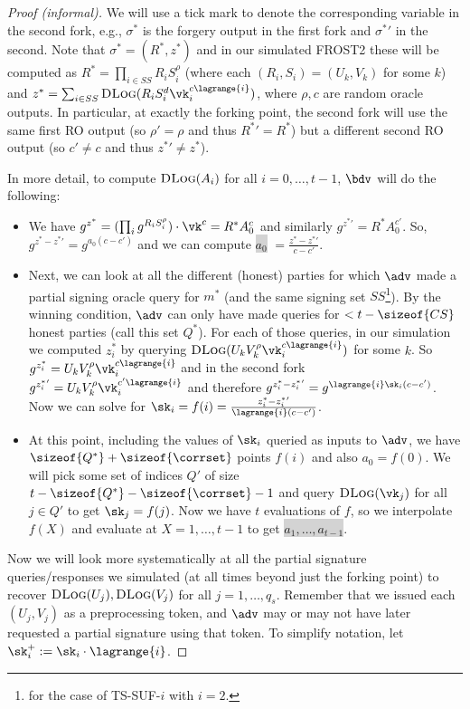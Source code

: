 \begin{proof}[Proof (informal)]
We will use a tick mark to denote the corresponding variable in the second fork, e.g., $\sigma^*$ is the forgery output in the first fork and ${\sigma^*}'$ in the second. Note that $\sigma^* = (R^*, z^*)$ and in our simulated FROST2 these will be computed as $R^* = \prod_{i \in SS} R_i S_i^\rho$ (where each $(R_i, S_i) = (U_k, V_k)$ for some $k$) and $z^* = \sum_{i \in SS} \textsc{DLog}(R_i S_i^d \vk_i^{c \lagrange{i}})$, where $\rho, c$ are random oracle outputs. In particular, at exactly the forking point, the second fork will use the same first RO output (so $\rho' = \rho$ and thus ${R^*}' = R^*$) but a different second RO output (so $c' \neq c$ and thus ${z^*}' \neq z^*$).

In more detail, to compute $\textsc{DLog}(A_i)$ for all $i=0, \dots, t-1$, $\bdv$ will do the following:
\begin{itemize}
    \item We have $g^{z^*} = (\prod_i g^{R_i S_i^\rho}) \cdot \vk^c = R^* A_0^c$ and similarly $g^{{z^*}'} = R^* A_0^{c'}$. So, $g^{z^* - {z^*}'} = g^{a_0 (c-c')}$ and we can compute \colorbox{lightgray}{$a_0$} $= \frac{z^* - {z^*}'}{c - c'}$.
    \item Next, we can look at all the different (honest) parties for which $\adv$ made a partial signing oracle query for $m^*$ (and the same signing set $SS$\footnote{for the case of TS-SUF-$i$ with $i=2$.}). By the winning condition, $\adv$ can only have made queries for $< t-\sizeof{CS}$ honest parties (call this set $Q^*$). For each of those queries, in our simulation we computed $z_i^*$ by querying $\textsc{DLog}(U_k V_k^\rho \vk_i^{c \lagrange{i}})$ for some $k$. So $g^{z_i^*} = U_k V_k^\rho \vk_i^{c \lagrange{i}}$ and in the second fork $g^{{z_i^*}'} = U_k V_k^\rho \vk_i^{c' \lagrange{i}}$ and therefore $g^{z_i^* - {z_i^*}'} = g^{\lagrange{i}\sk_i (c-c')}$. Now we can solve for $\sk_i = f(i) = \frac{z_i^* - {z_i^*}'}{\lagrange{i}(c-c')}$.
    \item At this point, including the values of $\sk_i$ queried as inputs to $\adv$, we have $\sizeof{Q^*} + \sizeof{\corrset}$ points $f(i)$ and also $a_0 = f(0)$. We will pick some set of indices $Q'$ of size $t - \sizeof{Q^*} - \sizeof{\corrset} - 1$ and query $\textsc{DLog}(\vk_{j})$ for all $j \in Q'$ to get $\sk_j = f(j)$. Now we have $t$ evaluations of $f$, so we interpolate $f(X)$ and evaluate at $X = 1, \dots, t-1$ to get \colorbox{lightgray}{$a_1, \dots, a_{t-1}$}.
\end{itemize}

Now we will look more systematically at all the partial signature queries/{\allowbreak}responses we simulated (at all times beyond just the forking point) to recover $\textsc{DLog}(U_j),\allowbreak \textsc{DLog}(V_j)$ for all $j = 1, \dots, q_s$. Remember that we issued each $(U_j, V_j)$ as a preprocessing token, and $\adv$ may or may not have later requested a partial signature using that token. To simplify notation, let $\sk_i^+ := \sk_i \cdot \lagrange{i}$.


\end{proof}
